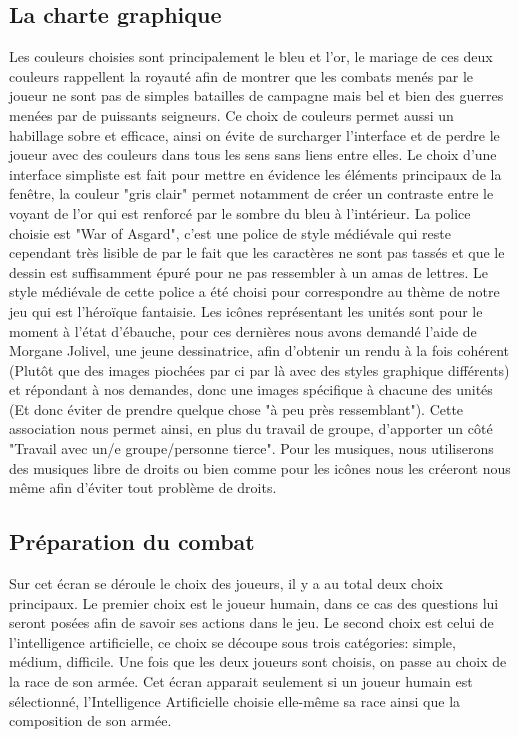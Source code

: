 \documentclass{article}
\begin{document}
 \subsection{La charte graphique}
		Les couleurs choisies sont principalement le bleu et l'or, le mariage de ces deux couleurs rappellent la royauté afin de montrer que les combats menés par le joueur ne sont pas de simples batailles de campagne mais bel et bien des guerres menées par de puissants seigneurs. Ce choix de couleurs permet aussi un habillage sobre et efficace, ainsi on évite de surcharger l'interface et de perdre le joueur avec des couleurs dans tous les sens sans liens entre elles. Le choix d'une interface simpliste est fait pour mettre en évidence les éléments principaux de la fenêtre, la couleur "gris clair" permet notamment de créer un contraste entre le voyant de l'or qui est renforcé par le sombre du bleu à l'intérieur. La police choisie est "War of Asgard", c'est une police de style médiévale qui reste cependant très lisible de par le fait que les caractères ne sont pas tassés et que le dessin est suffisamment épuré pour ne pas ressembler à un amas de lettres. Le style médiévale de cette police a été choisi pour correspondre au thème de notre jeu qui est l'héroïque fantaisie. Les icônes représentant les unités sont pour le moment à l'état d'ébauche, pour ces dernières nous avons demandé l'aide de Morgane Jolivel, une jeune dessinatrice, afin d'obtenir un rendu à la fois cohérent (Plutôt que des images piochées par ci par là avec des styles graphique différents) et répondant à nos demandes, donc une images spécifique à chacune des unités (Et donc éviter de prendre quelque chose "à peu près ressemblant"). Cette association nous permet ainsi, en plus du travail de groupe, d'apporter un côté "Travail avec un/e groupe/personne tierce". Pour les musiques, nous utiliserons des musiques libre de droits ou bien comme pour les icônes nous les créeront nous même afin d'éviter tout problème de droits.
		
 \subsection{Préparation du combat }
		Sur cet écran se déroule le choix des joueurs, il y a au total deux choix principaux. Le premier choix est le joueur humain, dans ce cas des questions lui seront posées afin de savoir ses actions dans le jeu. Le second choix est celui de l'intelligence artificielle, ce choix se découpe sous trois catégories: simple, médium, difficile. Une fois que les deux joueurs sont choisis, on passe au choix de la race de son armée. Cet écran apparait seulement si un joueur humain est sélectionné, l'Intelligence Artificielle choisie elle-même sa race ainsi que la composition de son armée.
		
\end{document}
